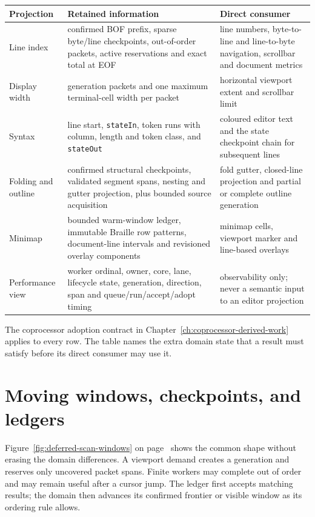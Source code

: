 \documentclass[a4paper,10pt,twoside,openany]{book}
\begin{document}
\begin{center}
\small
\setlength{\tabcolsep}{3pt}
\begin{tabular}{|p{}|p{}|p{}|}
  \hline
  \textbf{Projection} & \textbf{Retained information} & \textbf{Direct consumer} \\
  \hline
  Line index & confirmed BOF prefix, sparse byte/line checkpoints,
  out-of-order packets, active reservations and exact total at EOF & line
  numbers, byte-to-line and line-to-byte navigation, scrollbar and document
  metrics \\
  \hline
  Display width & generation packets and one maximum terminal-cell width per
  packet & horizontal viewport extent and scrollbar limit \\
  \hline
  Syntax & line start, \texttt{stateIn}, token runs with column, length and
  token class, and \texttt{stateOut} & coloured editor text and the state
  checkpoint chain for subsequent lines \\
  \hline
  Folding and outline & confirmed structural checkpoints, validated segment
  spans, nesting and gutter projection, plus bounded source acquisition & fold
  gutter, closed-line projection and partial or complete outline generation \\
  \hline
  Minimap & bounded warm-window ledger, immutable Braille row patterns,
  document-line intervals and revisioned overlay components & minimap cells,
  viewport marker and line-based overlays \\
  \hline
  Performance view & \raggedright worker ordinal, owner, core, lane, lifecycle state,
  generation, direction, span and queue/run/accept/adopt timing & observability
  only; never a semantic input to an editor projection \\
  \hline
\end{tabular}
\end{center}

The coprocessor adoption contract in
Chapter~\ref{ch:coprocessor-derived-work} applies to every row. The table names
the extra domain state that a result must satisfy before its direct consumer
may use it.

\section{Moving windows, checkpoints, and ledgers}
\label{sec:warmed-range-ledger}

Figure~\ref{fig:deferred-scan-windows} on
page~\pageref{fig:deferred-scan-windows} shows the common shape without
erasing the domain differences. A viewport demand creates a generation and
reserves only uncovered packet spans. Finite workers may complete out of order
and may remain useful after a cursor jump. The ledger first accepts matching
results; the domain then advances its confirmed frontier or visible window as
its ordering rule allows.
\end{document}
